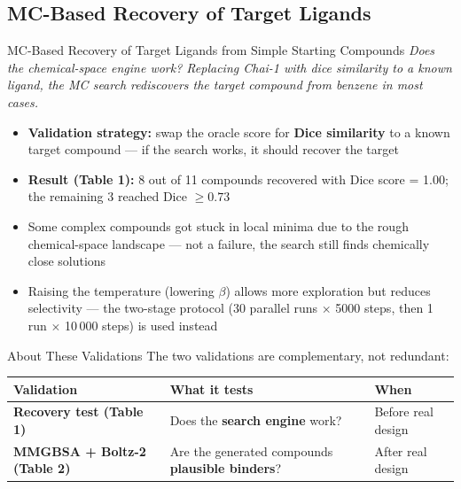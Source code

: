 \documentclass{beamer}
\begin{document}
\subsection{MC-Based Recovery of Target Ligands}

\begin{frame}{MC-Based Recovery of Target Ligands from Simple Starting Compounds}
  \textit{Does the chemical-space engine work? Replacing Chai-1 with dice similarity to a known ligand, the MC search rediscovers the target compound from benzene in most cases.}

  \vspace{0.6em}
  \begin{itemize}
    \item \textbf{Validation strategy:} swap the oracle score for \textbf{Dice similarity} to a known target compound --- if the search works, it should recover the target
    \item \textbf{Result (Table 1):} 8 out of 11 compounds recovered with Dice score = 1.00; the remaining 3 reached Dice $\geq 0.73$
    \item Some complex compounds got stuck in local minima due to the rough chemical-space landscape --- not a failure, the search still finds chemically close solutions
    \item Raising the temperature (lowering $\beta$) allows more exploration but reduces selectivity --- the two-stage protocol (30 parallel runs $\times$ 5000 steps, then 1 run $\times$ 10\,000 steps) is used instead
  \end{itemize}
\end{frame}


\begin{frame}{About These Validations}
  The two validations are complementary, not redundant:

  \vspace{0.8em}
  \begin{center}
    \renewcommand{\arraystretch}{1.5}
    \begin{tabular}{>{\bfseries}p{3.5cm} p{3.5cm} p{3cm}}
      \toprule
      Validation & What it tests & When \\
      \midrule
      Recovery test (Table 1) & Does the \textbf{search engine} work? & Before real design \\
      \addlinespace
      MMGBSA + Boltz-2 (Table 2) & Are the generated compounds \textbf{plausible binders}? & After real design \\
      \bottomrule
    \end{tabular}
  \end{center}
\end{frame}
\end{document}
